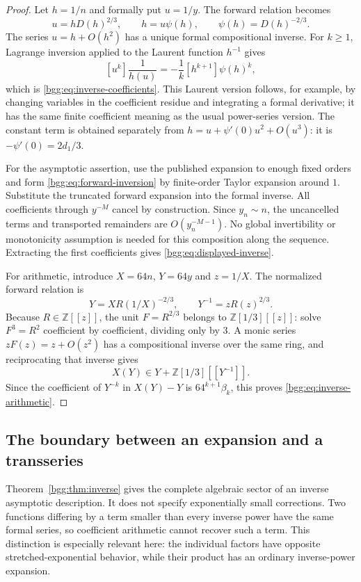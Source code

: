 \documentclass[11pt,a4paper]{article}
\numberwithin{equation}{section}
\theoremstyle{definition}
\theoremstyle{remark}
\theoremstyle{definition}
\newcommand{\Z}{\mathbb Z}
\begin{document}
\begin{proof}
Let $h=1/n$ and formally put $u=1/y$. The forward relation becomes
\[
 u=hD(h)^{2/3},\qquad h=u\psi(h),\qquad\psi(h)=D(h)^{-2/3}.
\]
The series $u=h+O(h^2)$ has a unique formal compositional inverse. For $k\ge1$,
Lagrange inversion applied to the Laurent function $h^{-1}$ gives
\[
 [u^k]\frac1{h(u)}=-\frac1k[h^{k+1}]\psi(h)^k,
\]
which is \eqref{bgg:eq:inverse-coefficients}. This Laurent version follows, for
example, by changing variables in the coefficient residue and integrating a
formal derivative; it has the same finite coefficient meaning as the usual
power-series version. The constant term is obtained separately from
$h=u+\psi'(0)u^2+O(u^3)$: it is $-\psi'(0)=2d_1/3$.

For the asymptotic assertion, use the published expansion to enough fixed
orders and form \eqref{bgg:eq:forward-inversion} by finite-order Taylor
expansion around $1$. Substitute the truncated forward expansion into the
formal inverse. All coefficients through $y^{-M}$ cancel by construction.
Since $y_n\sim n$, the uncancelled terms and transported remainders are
$O(y_n^{-M-1})$. No global invertibility or monotonicity assumption is needed
for this composition along the sequence. Extracting the first coefficients
gives \eqref{bgg:eq:displayed-inverse}.

For arithmetic, introduce $X=64n$, $Y=64y$ and $z=1/X$. The normalized
forward relation is
\[
 Y=XR(1/X)^{-2/3},\qquad Y^{-1}=zR(z)^{2/3}.
\]
Because $R\in\Z[[z]]$, the unit $F=R^{2/3}$ belongs to
$\Z[1/3][[z]]$: solve $F^3=R^2$ coefficient by coefficient, dividing only
by $3$. A monic series $zF(z)=z+O(z^2)$ has a compositional inverse over the
same ring, and reciprocating that inverse gives
\[
 X(Y)\in Y+\Z[1/3][[Y^{-1}]].
\]
Since the coefficient of $Y^{-k}$ in $X(Y)-Y$ is
$64^{k+1}\beta_k$, this proves \eqref{bgg:eq:inverse-arithmetic}.
\end{proof}

\subsection{The boundary between an expansion and a transseries}

Theorem~\ref{bgg:thm:inverse} gives the complete algebraic sector of an inverse
asymptotic description. It does not specify exponentially small corrections.
Two functions differing by a term smaller than every inverse power have the
same formal series, so coefficient arithmetic cannot recover such a term.
This distinction is especially relevant here: the individual factors have
opposite stretched-exponential behavior, while their product has an
ordinary inverse-power expansion.
\end{document}
